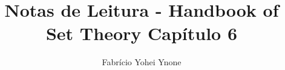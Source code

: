 \documentclass[12pt, a4paper]{book}
\title{Notas de Leitura - Handbook of Set Theory Capítulo 6}
\author{Fabrício Yohei Ynone}
\date{}
\begin{document}
\maketitle 
\tableofcontents


\newpage
\nocite{*}


\end{document}
